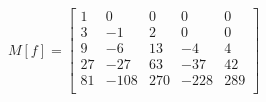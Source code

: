 \documentclass[preview]{standalone}
\begin{document}
\begin{align*}
M[f] = \begin{bmatrix}1 & 0 & 0 & 0 & 0 \\3 & -1 & 2 & 0 & 0 \\9 & -6 & 13 & -4 & 4 \\27 & -27 & 63 & -37 & 42 \\81 & -108 & 270 & -228 & 289 \\\end{bmatrix}
\end{align*}
\end{document}
